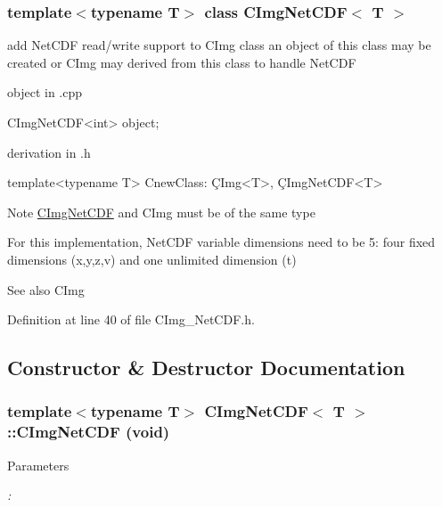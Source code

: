 \subsubsection*{template$<$typename T$>$ class CImgNetCDF$<$ T $>$}

add NetCDF read/write support to CImg class an object of this class may be created or CImg may derived from this class to handle NetCDF \begin{DoxyItemize}
\item object in {\ttfamily }.cpp 
\begin{DoxyCode}
   CImgNetCDF<int> object;
\end{DoxyCode}
 \item derivation in {\ttfamily }.h 
\begin{DoxyCode}
   template<typename T> CnewClass: \c CImg<T>, \c CImgNetCDF<T>
\end{DoxyCode}
\end{DoxyItemize}
\begin{DoxyNote}{Note}
{\ttfamily \hyperlink{classCImgNetCDF}{CImgNetCDF}} and {\ttfamily CImg} must be of the same type 

For this implementation, NetCDF variable dimensions need to be 5: four fixed dimensions (x,y,z,v) and one unlimited dimension (t)
\end{DoxyNote}


\begin{DoxySeeAlso}{See also}
CImg 
\end{DoxySeeAlso}


Definition at line 40 of file CImg\_\-NetCDF.h.

\subsection{Constructor \& Destructor Documentation}
\hypertarget{classCImgNetCDF_ac067a8f473f246cd11de6b7320a98631}{
\subsubsection[{CImgNetCDF}]{\setlength{\rightskip}{0pt plus 5cm}template$<$typename T$>$ {\bf CImgNetCDF}$<$ T $>$::{\bf CImgNetCDF} (void)}}
\label{classCImgNetCDF_ac067a8f473f246cd11de6b7320a98631}

\begin{DoxyParams}{Parameters}
\item[{\em :}]\end{DoxyParams}

